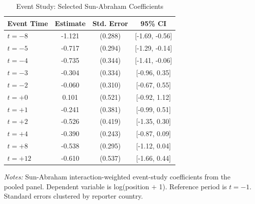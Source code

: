 \begin{table}[t]
\centering
\caption{Event Study: Selected Sun-Abraham Coefficients}
\label{tab:eventstudy}
\begin{tabular}{lccc}
\hline\hline
Event Time & Estimate & Std. Error & 95\% CI \\
\hline
$t = -8$ & -1.121 & (0.288) & [-1.69, -0.56] \\
$t = -5$ & -0.717 & (0.294) & [-1.29, -0.14] \\
$t = -4$ & -0.735 & (0.344) & [-1.41, -0.06] \\
$t = -3$ & -0.304 & (0.334) & [-0.96, 0.35] \\
$t = -2$ & -0.060 & (0.310) & [-0.67, 0.55] \\
$t = +0$ & 0.101 & (0.521) & [-0.92, 1.12] \\
$t = +1$ & -0.241 & (0.381) & [-0.99, 0.51] \\
$t = +2$ & -0.526 & (0.419) & [-1.35, 0.30] \\
$t = +4$ & -0.390 & (0.243) & [-0.87, 0.09] \\
$t = +8$ & -0.538 & (0.295) & [-1.12, 0.04] \\
$t = +12$ & -0.610 & (0.537) & [-1.66, 0.44] \\
\hline\hline
\end{tabular}
\begin{tablenotes}
\item \textit{Notes:} Sun-Abraham interaction-weighted event-study coefficients from the pooled panel. Dependent variable is log(position $+$ 1). Reference period is $t = -1$. Standard errors clustered by reporter country.
\end{tablenotes}
\end{table}


